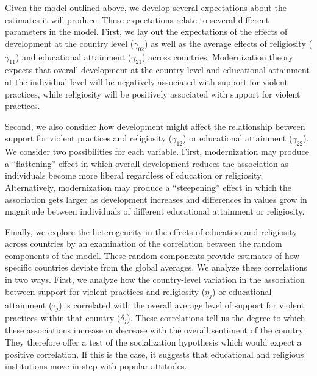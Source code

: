 \documentclass[10pt,letterpaper]{article}
\begin{document}
Given the model outlined above, we develop several expectations about
the estimates it will produce. These expectations relate to several
different parameters in the model. First, we lay out the expectations of
the effects of development at the country level (\(\gamma_{02}\)) as
well as the average effects of religiosity (\(\gamma_{11}\)) and
educational attainment (\(\gamma_{21}\)) across countries. Modernization
theory expects that overall development at the country level and
educational attainment at the individual level will be negatively
associated with support for violent practices, while religiosity will be
positively associated with support for violent practices.

Second, we also consider how development might affect the relationship
between support for violent practices and religiosity (\(\gamma_{12}\))
or educational attainment (\(\gamma_{22}\)). We consider two
possibilities for each variable. First, modernization may produce a
``flattening'' effect in which overall development reduces the
association as individuals become more liberal regardless of education
or religiosity. Alternatively, modernization may produce a
``steepening'' effect in which the association gets larger as
development increases and differences in values grow in magnitude
between individuals of different educational attainment or religiosity.

Finally, we explore the heterogeneity in the effects of education and
religiosity across countries by an examination of the correlation
between the random components of the model. These random components
provide estimates of how specific countries deviate from the global
averages. We analyze these correlations in two ways. First, we analyze
how the country-level variation in the association between support for
violent practices and religiosity (\(\eta_j\)) or educational attainment
(\(\tau_j\)) is correlated with the overall average level of support for
violent practices within that country (\(\delta_j\)). These correlations
tell us the degree to which these associations increase or decrease with
the overall sentiment of the country. They therefore offer a test of the
socialization hypothesis which would expect a positive correlation. If
this is the case, it suggests that educational and religious
institutions move in step with popular attitudes.
\end{document}
